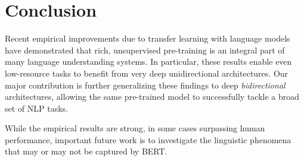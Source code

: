 
\section{Conclusion}
Recent empirical improvements due to transfer learning with language models have demonstrated that rich, unsupervised pre-training is an integral part of many language understanding systems. In particular, these results enable even low-resource tasks to benefit from very deep unidirectional architectures. Our major contribution is further generalizing these findings to deep \emph{bidirectional} architectures, allowing the same pre-trained model to successfully tackle a broad set of NLP tasks.

While the empirical results are strong, in some cases surpassing human performance, important future work is to investigate the linguistic phenomena that may or may not be captured by BERT. 